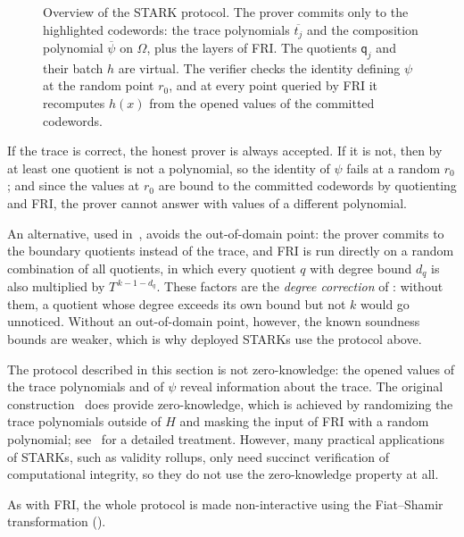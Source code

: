 \documentclass[../../book]{subfiles}
\begin{document}
\begin{figure}[h!]
{
    }
    \caption{Overview of the STARK protocol. The prover commits only to the highlighted codewords: the trace polynomials $\overline{t_j}$ and the composition polynomial $\overline{\psi}$ on $\Omega$, plus the layers of FRI. The quotients $\mathsf{q}_j$ and their batch $h$ are virtual. The verifier checks the identity defining $\psi$ at the random point $r_0$, and at every point queried by FRI it recomputes $h(x)$ from the opened values of the committed codewords.}
    \label{fig:stark-scheme}
\end{figure}

If the trace is correct, the honest prover is always accepted.
If it is not, then by  at least one quotient is not a polynomial, so the identity of $\psi$ fails at a random $r_0$; and since the values at $r_0$ are bound to the committed codewords by quotienting and FRI, the prover cannot answer with values of a different polynomial.

\begin{remark}
  An alternative, used in~\cite{szepieniec2021anatomy}, avoids the out-of-domain point: the prover commits to the boundary quotients instead of the trace, and FRI is run directly on a random combination of all quotients, in which every quotient $q$ with degree bound $d_q$ is also multiplied by $T^{\,k - 1 - d_q}$.
  These factors are the \emph{degree correction} of : without them, a quotient whose degree exceeds its own bound but not $k$ would go unnoticed.
  Without an out-of-domain point, however, the known soundness bounds are weaker, which is why deployed STARKs use the protocol above.
\end{remark}

\begin{remark}
  The protocol described in this section is not zero-knowledge: the opened values of the trace polynomials and of $\psi$ reveal information about the trace.
  The original construction~\cite{EPRINT:BBHR18} does provide zero-knowledge, which is achieved by randomizing the trace polynomials outside of $H$ and masking the input of FRI with a random polynomial; see~\cite{EPRINT:HabKin24} for a detailed treatment.
  However, many practical applications of STARKs, such as validity rollups, only need succinct verification of computational integrity, so they do not use the zero-knowledge property at all.
\end{remark}

\begin{remark}
  As with FRI, the whole protocol is made non-interactive using the Fiat--Shamir transformation ().
\end{remark}
\end{document}

